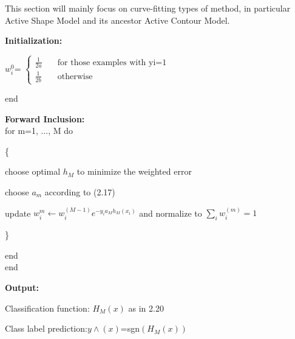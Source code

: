 \documentclass[12pt]{report}
\begin{document}
\par
This section will mainly focus on curve-fitting types of method, in particular Active Shape Model and its ancestor Active Contour Model.

\begin{algorithm}[t]
	\KwInput{}

	\KwInitialization\:{
		\[
			$$ w_i^{(0)} = 
			\begin{cases}
				$\frac{1}{2a}$ &\quad \text{for those examples with y_i = 1}\\ 
				$\frac{1}{2b}$ &\quad \text{otherwise}
			\end{cases}
			$$
		\]
	}
\end{algorithm}

\textbf{Initialization:} \\
\par $w_i^{0}$=
$\begin{cases}
	\frac{1}{2a}  & \quad \text{for those examples with yi=1} \\
	\frac{1}{2b}  & \quad \text{otherwise}
\end{cases}$ \\
\par end

\textbf{Forward Inclusion:} \\

 for m=1, ..., M do \\
\par \{
\par choose optimal $h_M$ to minimize the weighted error \\
\par choose $a_m$ according to (2.17) \\
\par update $w_i^{m} \leftarrow w_i^{(M-1)}e^{-y_ia_Mh_M(x_i)}$ and normalize to $\displaystyle\sum_{i}w_i^{(m)}=1$  \\
\par \}
\par end \\
 end \\
 \par 
\textbf{Output:} \\
\par Classification function: $H_M(x)$ as in 2.20 \\
\par Class label prediction:$y\land(x)$=sgn$(H_M(x))$
\end{document}
